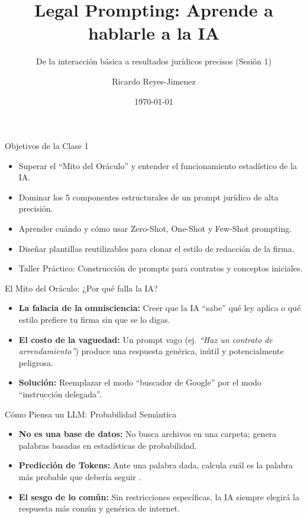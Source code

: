\documentclass[aspectratio=169]{beamer}
\title[ Legal Prompting]{ Legal Prompting: Aprende a hablarle a la IA}
\subtitle{ De la interacción básica a resultados jurídicos precisos (Sesión 1)}
\author{Ricardo Reyes-Jimenez}
\institute{Universidad de La Sabana}
\date{\today}
\begin{document}
\begin{frame}
  \titlepage
\end{frame}

\usebackgroundtemplate{}



\begin{frame}[fragile]{Objetivos de la Clase 1}


\begin{itemize}
  \item Superar el ``Mito del Oráculo'' y entender el funcionamiento estadístico de la IA.
  \item Dominar los 5 componentes estructurales de un prompt jurídico de alta precisión.
  \item Aprender cuándo y cómo usar Zero-Shot, One-Shot y Few-Shot prompting.
  \item Diseñar plantillas reutilizables para clonar el estilo de redacción de la firma.
  \item Taller Práctico: Construcción de prompts para contratos y conceptos iniciales.
\end{itemize}
\end{frame}



\begin{frame}[fragile]{El Mito del Oráculo: ¿Por qué falla la IA?}


\begin{itemize}
  \item \textbf{La falacia de la omnisciencia:} Creer que la IA ``sabe'' qué ley aplica o qué estilo prefiere tu firma sin que se lo digas.
  \item \textbf{El costo de la vaguedad:} Un prompt vago (ej. \textit{``Haz un contrato de arrendamiento''}) produce una respuesta genérica, inútil y potencialmente peligrosa.
  \item \textbf{Solución:} Reemplazar el modo ``buscador de Google'' por el modo ``instrucción delegada''.
\end{itemize}
\end{frame}



\begin{frame}[fragile]{Cómo Piensa un LLM: Probabilidad Semántica}


\begin{itemize}
  \item \textbf{No es una base de datos:} No busca archivos en una carpeta; genera palabras basadas en estadísticas de probabilidad.
  \item \textbf{Predicción de Tokens:} Ante una palabra dada, calcula cuál es la palabra más probable que debería seguir \cite{surden2019}.
  \item \textbf{El sesgo de lo común:} Sin restricciones específicas, la IA siempre elegirá la respuesta más común y genérica de internet.
\end{itemize}
\end{frame}
\end{document}
